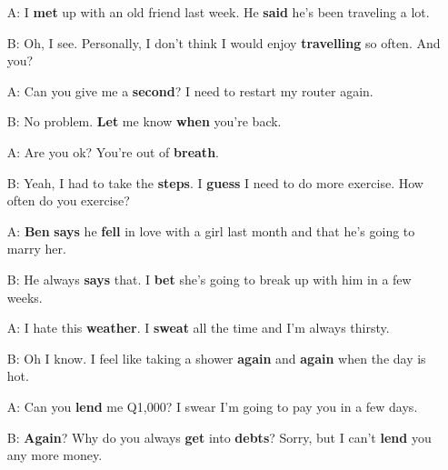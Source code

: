 \begin{itemize}
  \item[A:] I \textbf{m\textcolor{fancyorange}{e}t} up with an old friend last week. He \textbf{s\textcolor{fancyorange}{a}id} he's been traveling a lot.
  \item[B:] Oh, I see. Personally, I don't think I would enjoy \textbf{trav\textcolor{fancyorange}{e}lling} so often. And you?
\end{itemize}

\begin{itemize}
  \item[A:] Can you give me a \textbf{s\textcolor{fancyorange}{e}cond}? I need to restart my router again.
  \item[B:] No problem. \textbf{L\textcolor{fancyorange}{e}t} me know \textbf{wh\textcolor{fancyorange}{e}n} you're back.
\end{itemize}

\begin{itemize}
  \item[A:] Are you ok? You're out of \textbf{br\textcolor{fancyorange}{e}ath}.
  \item[B:] Yeah, I had to take the \textbf{st\textcolor{fancyorange}{e}ps}. I \textbf{gu\textcolor{fancyorange}{e}ss} I need to do more exercise. How often do you exercise?
\end{itemize}

\begin{itemize}
  \item[A:] \textbf{B\textcolor{fancyorange}{e}n} \textbf{s\textcolor{fancyorange}{a}ys} he \textbf{f\textcolor{fancyorange}{e}ll} in love with a girl last month and that he's going to marry her.
  \item[B:] He always \textbf{s\textcolor{fancyorange}{a}ys} that. I \textbf{b\textcolor{fancyorange}{e}t} she's going to break up with him in a few weeks.
\end{itemize}

\begin{itemize}
  \item[A:] I hate this \textbf{w\textcolor{fancyorange}{e}ather}. I \textbf{sw\textcolor{fancyorange}{e}at} all the time and I'm always thirsty.
  \item[B:] Oh I know. I feel like taking a shower \textbf{ag\textcolor{fancyorange}{a}in} and \textbf{ag\textcolor{fancyorange}{a}in} when the day is hot.
\end{itemize}

\begin{itemize}
  \item[A:] Can you \textbf{l\textcolor{fancyorange}{e}nd} me Q1,000? I swear I'm going to pay you in a few days.
  \item[B:] \textbf{Ag\textcolor{fancyorange}{a}in}? Why do you always \textbf{g\textcolor{fancyorange}{e}t} into \textbf{d\textcolor{fancyorange}{e}bts}? Sorry, but I can't \textbf{l\textcolor{fancyorange}{e}nd} you any more money.
\end{itemize}

